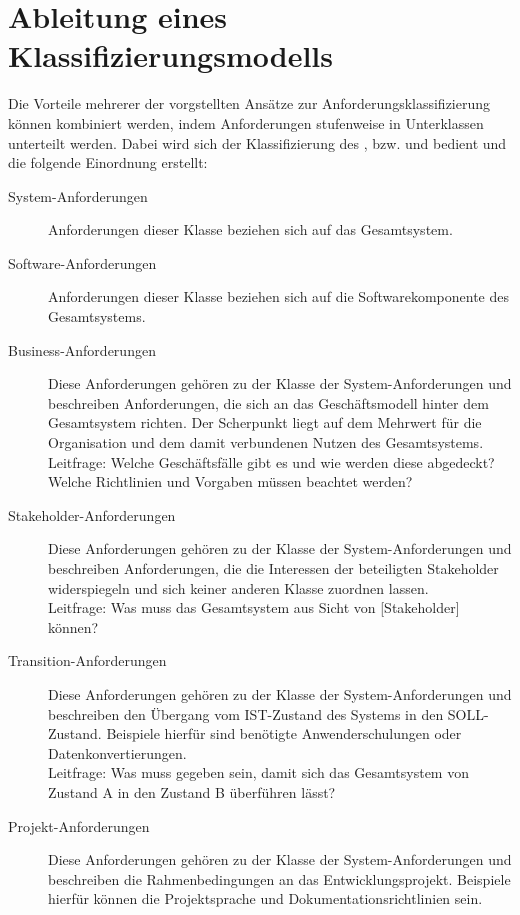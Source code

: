 \section{Ableitung eines Klassifizierungsmodells}
\label{sec:requirements:model}
Die Vorteile mehrerer der vorgstellten Ansätze zur Anforderungsklassifizierung können kombiniert werden, indem Anforderungen stufenweise in Unterklassen unterteilt werden. Dabei wird sich der Klassifizierung des \cite{SWEBOK}, \cite{PMBOK} bzw. \cite{BABOK} und \cite{ISO25010} bedient und die folgende Einordnung erstellt:

\begin{description}
  \item[System-Anforderungen] Anforderungen dieser Klasse beziehen sich auf das Gesamtsystem.\\
  \item[Software-Anforderungen] Anforderungen dieser Klasse beziehen sich auf die Softwarekomponente des Gesamtsystems.\\
  \item[Business-Anforderungen] Diese Anforderungen gehören zu der Klasse der System-Anforderungen und beschreiben Anforderungen, die sich an das Geschäftsmodell hinter dem Gesamtsystem richten. Der Scherpunkt liegt auf dem Mehrwert für die Organisation und dem damit verbundenen Nutzen des Gesamtsystems.\\
  Leitfrage: \glqq Welche Geschäftsfälle gibt es und wie werden diese abgedeckt? Welche Richtlinien und Vorgaben müssen beachtet werden? \grqq
  \item[Stakeholder-Anforderungen] Diese Anforderungen gehören zu der Klasse der System-Anforderungen und beschreiben Anforderungen, die die Interessen der beteiligten Stakeholder widerspiegeln und sich keiner anderen Klasse zuordnen lassen.\\
  Leitfrage: \glqq Was muss das Gesamtsystem aus Sicht von [Stakeholder] können? \grqq
  \item[Transition-Anforderungen] Diese Anforderungen gehören zu der Klasse der System-Anforderungen und beschreiben den Übergang vom IST-Zustand des Systems in den SOLL-Zustand. Beispiele hierfür sind benötigte Anwenderschulungen oder Datenkonvertierungen.\\
  Leitfrage: \glqq Was muss gegeben sein, damit sich das Gesamtsystem von Zustand A in den Zustand B überführen lässt? \grqq
  \item[Projekt-Anforderungen] Diese Anforderungen gehören zu der Klasse der System-Anforderungen und beschreiben die Rahmenbedingungen an das Entwicklungsprojekt. Beispiele hierfür können die Projektsprache und Dokumentationsrichtlinien sein.\\

\end{description}
